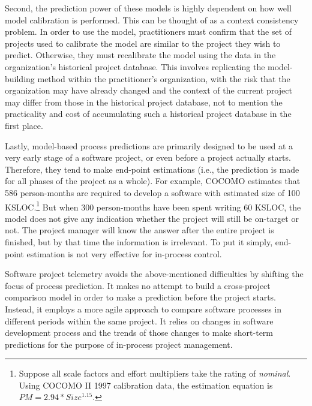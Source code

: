 Second, the prediction power of these models is highly dependent on how well model calibration is performed. This can be thought of as a context consistency problem. In order to use the model, practitioners must confirm that the set of projects used to calibrate the model are similar to the project they wish to predict. Otherwise, they must recalibrate the model using the data in the organization's historical project database. This involves replicating the model-building method within the practitioner's organization, with the risk that the organization may have already changed and the context of the current project may differ from those in the historical project database, not to mention the practicality and cost of accumulating such a historical project database in the first place. 

Lastly, model-based process predictions are primarily designed to be used at a very early stage of a software project, or even before a project actually starts. Therefore, they tend to make end-point estimations (i.e., the prediction is made for all phases of the project as a whole). For example, COCOMO estimates that 586 person-months are required to develop a software with estimated size of 100 KSLOC.\footnote{Suppose all scale factors and effort multipliers take the rating of \textit{nominal}. Using COCOMO II 1997 calibration data, the estimation equation is $PM = 2.94 * Size ^ {1.15}$.} But when 300 person-months have been spent writing 60 KSLOC, the model does not give any indication whether the project will still be on-target or not. The project manager will know the answer after the entire project is finished, but by that time the information is irrelevant. To put it simply, end-point estimation is not very effective for in-process control.

Software project telemetry avoids the above-mentioned difficulties by shifting the focus of process prediction. It makes no attempt to build a cross-project comparison model in order to make a prediction before the project starts. Instead, it employs a more agile approach to compare software processes in different periods within the same project. It relies on changes in software development process and the trends of those changes to make short-term predictions for the purpose of in-process project management. 











